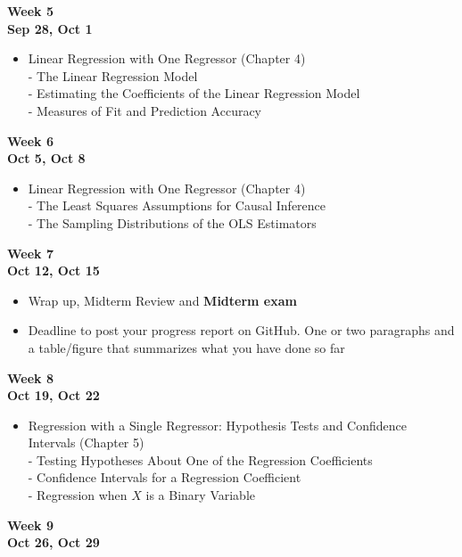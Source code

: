 \documentclass[
]{book}
\providecommand{\tightlist}{%
  \setlength{\itemsep}{0pt}\setlength{\parskip}{0pt}}
\begin{document}
\textbf{Week 5}\\
\textbf{Sep 28, Oct 1}

\begin{itemize}
\tightlist
\item
  Linear Regression with One Regressor (Chapter 4)\\
  - The Linear Regression Model\\
  - Estimating the Coefficients of the Linear Regression Model\\
  - Measures of Fit and Prediction Accuracy
\end{itemize}

\textbf{Week 6}\\
\textbf{Oct 5, Oct 8}

\begin{itemize}
\tightlist
\item
  Linear Regression with One Regressor (Chapter 4)\\
  - The Least Squares Assumptions for Causal Inference\\
  - The Sampling Distributions of the OLS Estimators
\end{itemize}

\textbf{Week 7}\\
\textbf{Oct 12, Oct 15}

\begin{itemize}
\tightlist
\item
  Wrap up, Midterm Review and \textbf{Midterm exam}
\item
  Deadline to post your progress report on GitHub. One or two paragraphs and a table/figure that summarizes what you have done so far
\end{itemize}

\textbf{Week 8}\\
\textbf{Oct 19, Oct 22}

\begin{itemize}
\tightlist
\item
  Regression with a Single Regressor: Hypothesis Tests and Confidence Intervals (Chapter 5)\\
  - Testing Hypotheses About One of the Regression Coefficients\\
  - Confidence Intervals for a Regression Coefficient\\
  - Regression when \(X\) is a Binary Variable
\end{itemize}

\textbf{Week 9}\\
\textbf{Oct 26, Oct 29}
\end{document}
